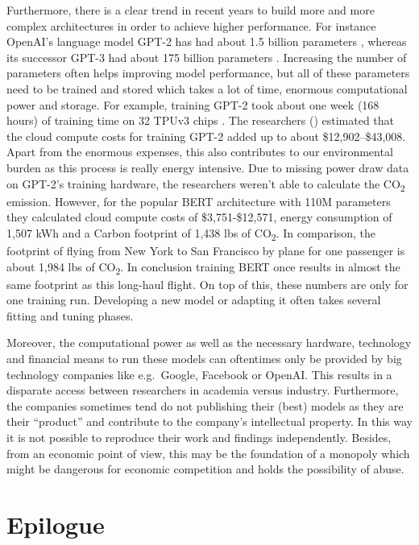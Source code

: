 \documentclass[
]{krantz}
\begin{document}
Furthermore, there is a clear trend in recent years to build more and more complex architectures in order to achieve higher performance. For instance OpenAI's language model GPT-2 has had about 1.5 billion parameters \citep{Radford2019LanguageMA}, whereas its successor GPT-3 had about 175 billion parameters \citep{brown2020language}. Increasing the number of parameters often helps improving model performance, but all of these parameters need to be trained and stored which takes a lot of time, enormous computational power and storage. For example, training GPT-2 took about one week (168 hours) of training time on 32 TPUv3 chips \citep{environment}. The researchers (\citet{environment}) estimated that the cloud compute costs for training GPT-2 added up to about \$12,902--\$43,008. Apart from the enormous expenses, this also contributes to our environmental burden as this process is really energy intensive. Due to missing power draw data on GPT-2's training hardware, the researchers weren't able to calculate the CO\textsubscript{2} emission. However, for the popular BERT architecture with 110M parameters they calculated cloud compute costs of \$3,751-\$12,571, energy consumption of 1,507 kWh and a Carbon footprint of 1,438 lbs of CO\textsubscript{2}. In comparison, the footprint of flying from New York to San Francisco by plane for one passenger is about 1,984 lbs of CO\textsubscript{2}. In conclusion training BERT once results in almost the same footprint as this long-haul flight. On top of this, these numbers are only for one training run. Developing a new model or adapting it often takes several fitting and tuning phases.

Moreover, the computational power as well as the necessary hardware, technology and financial means to run these models can oftentimes only be provided by big technology companies like e.g.~Google, Facebook or OpenAI. This results in a disparate access between researchers in academia versus industry. Furthermore, the companies sometimes tend do not publishing their (best) models as they are their ``product'' and contribute to the company's intellectual property. In this way it is not possible to reproduce their work and findings independently. Besides, from an economic point of view, this may be the foundation of a monopoly which might be dangerous for economic competition and holds the possibility of abuse.

\hypertarget{epilogue}{%
\chapter{Epilogue}\label{epilogue}}
\end{document}
